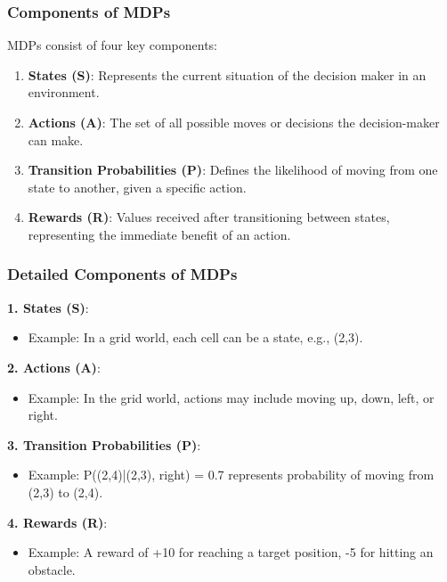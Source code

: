 \documentclass{beamer}
\begin{document}
\begin{frame}[fragile]
    \frametitle{Components of MDPs}
    MDPs consist of four key components:

    \begin{enumerate}
        \item \textbf{States (S)}: Represents the current situation of the decision maker in an environment.
        \item \textbf{Actions (A)}: The set of all possible moves or decisions the decision-maker can make.
        \item \textbf{Transition Probabilities (P)}: Defines the likelihood of moving from one state to another, given a specific action.
        \item \textbf{Rewards (R)}: Values received after transitioning between states, representing the immediate benefit of an action.
    \end{enumerate}
\end{frame}

\begin{frame}[fragile]
    \frametitle{Detailed Components of MDPs}
    
    \textbf{1. States (S)}: 
    \begin{itemize}
        \item Example: In a grid world, each cell can be a state, e.g., (2,3).
    \end{itemize}

    \textbf{2. Actions (A)}: 
    \begin{itemize}
        \item Example: In the grid world, actions may include moving up, down, left, or right.
    \end{itemize}

    \textbf{3. Transition Probabilities (P)}: 
    \begin{itemize}
        \item Example: P((2,4)|(2,3), right) = 0.7 represents probability of moving from (2,3) to (2,4).
    \end{itemize}

    \textbf{4. Rewards (R)}: 
    \begin{itemize}
        \item Example: A reward of +10 for reaching a target position, -5 for hitting an obstacle.
    \end{itemize}
\end{frame}
\end{document}
